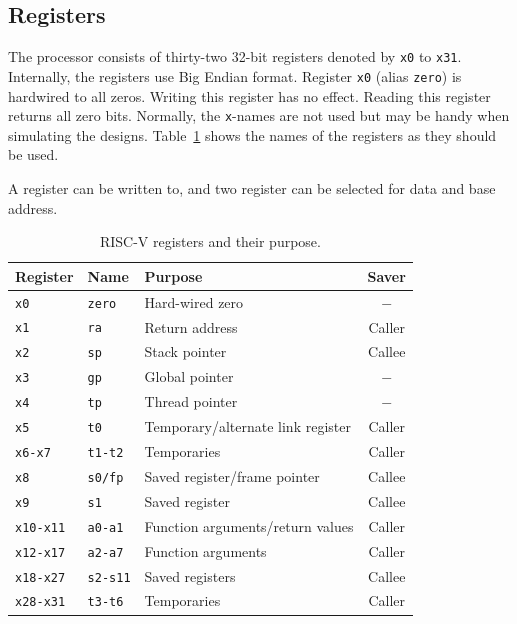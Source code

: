 \documentclass[12pt]{article}
\begin{document}
\subsection{Registers}
The processor consists of thirty-two 32-bit registers denoted by \texttt{x0} to \texttt{x31}. Internally, the registers use Big Endian format. Register \texttt{x0} (alias \texttt{zero}) is hardwired to all zeros. Writing this register has no effect. Reading this register returns all zero bits. Normally, the \texttt{x}-names are not used but may be handy when simulating the designs. Table~\ref{tab:registers} shows the names of the registers as they should be used.

A register can be written to, and two register can be selected for data and base address.

\begin{table}[!ht]
\centering
\caption{RISC-V registers and their purpose.}
\label{tab:registers}
\begin{tabular}{lllc}
Register & Name & Purpose & Saver \\
\midrule
\texttt{x0}      & \texttt{zero}   & Hard-wired zero                   & $-$ \\
\texttt{x1}      & \texttt{ra}     & Return address                    & Caller \\
\texttt{x2}      & \texttt{sp}     & Stack pointer                     & Callee \\
\texttt{x3}      & \texttt{gp}     & Global pointer                    & $-$ \\
\texttt{x4}      & \texttt{tp}     & Thread pointer                    & $-$ \\
\texttt{x5}      & \texttt{t0}     & Temporary/alternate link register & Caller \\
\texttt{x6-x7}   & \texttt{t1-t2}  & Temporaries                       & Caller \\
\texttt{x8}      & \texttt{s0/fp}  & Saved register/frame pointer      & Callee \\
\texttt{x9}      & \texttt{s1}     & Saved register                    & Callee \\
\texttt{x10-x11} & \texttt{a0-a1}  & Function arguments/return values  & Caller \\
\texttt{x12-x17} & \texttt{a2-a7}  & Function arguments                & Caller \\
\texttt{x18-x27} & \texttt{s2-s11} & Saved registers                   & Callee \\
\texttt{x28-x31} & \texttt{t3-t6}  & Temporaries                       & Caller
\end{tabular}
\end{table}
\end{document}
